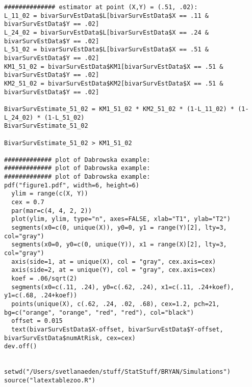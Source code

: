 \documentclass[]{article}
\begin{document}
{{\begin{verbatim}
############## estimator at point (X,Y) = (.51, .02):
L_11_02 = bivarSurvEstData$L[bivarSurvEstData$X == .11 & bivarSurvEstData$Y == .02]
L_24_02 = bivarSurvEstData$L[bivarSurvEstData$X == .24 & bivarSurvEstData$Y == .02]
L_51_02 = bivarSurvEstData$L[bivarSurvEstData$X == .51 & bivarSurvEstData$Y == .02]
KM1_51_02 = bivarSurvEstData$KM1[bivarSurvEstData$X == .51 & bivarSurvEstData$Y == .02]
KM2_51_02 = bivarSurvEstData$KM2[bivarSurvEstData$X == .51 & bivarSurvEstData$Y == .02]

BivarSurvEstimate_51_02 = KM1_51_02 * KM2_51_02 * (1-L_11_02) * (1-L_24_02) * (1-L_51_02)
BivarSurvEstimate_51_02

BivarSurvEstimate_51_02 > KM1_51_02

############# plot of Dabrowska example:
############# plot of Dabrowska example:
############# plot of Dabrowska example:
pdf("figure1.pdf", width=6, height=6)
  ylim = range(c(X, Y))
  cex = 0.7
  par(mar=c(4, 4, 2, 2))
  plot(ylim, ylim, type="n", axes=FALSE, xlab="T1", ylab="T2")
  segments(x0=c(0, unique(X)), y0=0, y1 = range(Y)[2], lty=3, col="gray")
  segments(x0=0, y0=c(0, unique(Y)), x1 = range(X)[2], lty=3, col="gray")
  axis(side=1, at = unique(X), col = "gray", cex.axis=cex)
  axis(side=2, at = unique(Y), col = "gray", cex.axis=cex)
  koef = .06/sqrt(2)
  segments(x0=c(.11, .24), y0=c(.62, .24), x1=c(.11, .24+koef), y1=c(.68, .24+koef))
  points(unique(X), c(.62, .24, .02, .68), cex=1.2, pch=21, bg=c("orange", "orange", "red", "red"), col="black")
  offset = 0.015
  text(bivarSurvEstData$X-offset, bivarSurvEstData$Y-offset, bivarSurvEstData$numAtRisk, cex=cex)
dev.off()


setwd("/Users/svetlanaeden/stuff/StatStuff/BRYAN/Simulations")
source("latextablezoo.R")


\end{verbatim}}}
\end{document}
